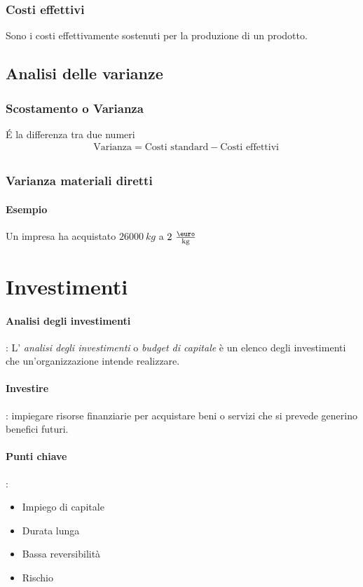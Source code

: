\documentclass{article}
\begin{document}
\subsubsection*{Costi effettivi}
Sono i costi effettivamente sostenuti per la produzione di un prodotto.
\subsection{Analisi delle varianze}
\subsubsection*{Scostamento o Varianza}
\'E la differenza tra due numeri
\begin{align*}
     & \text{Varianza} = \text{Costi standard} - \text{Costi effettivi} \\
\end{align*}
\subsubsection*{Varianza materiali diretti}
\paragraph{Esempio}
Un impresa ha acquistato $\num{26000}\ \unit{kg}$ a $\num{2}\ \frac{\text{\euro}}{\unit{kg}}$

\newpage

\section{Investimenti}
\paragraph{Analisi degli investimenti} : L' \textit{analisi degli investimenti} o \textit{budget di capitale} è un elenco degli investimenti che un'organizzazione intende realizzare.
\paragraph{Investire} : impiegare risorse finanziarie per acquistare beni o servizi che si prevede generino benefici futuri.
\paragraph{Punti chiave} :
\begin{itemize}
    \item Impiego di capitale
    \item Durata lunga
    \item Bassa reversibilità
    \item Rischio
\end{itemize}
\end{document}
